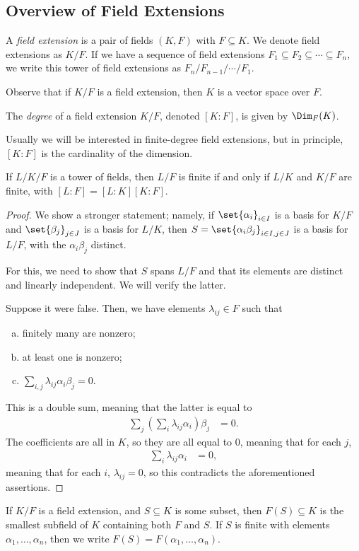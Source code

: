 \documentclass[10pt]{mypackage}
\begin{document}
\subsection{Overview of Field Extensions}%
\begin{definition}
  A \textit{field extension} is a pair of fields $\left( K,F \right)$ with $F\subseteq K$. We denote field extensions as $K/F$. If we have a sequence of field extensions $F_1\subseteq F_2\subseteq\cdots\subseteq F_n$, we write this tower of field extensions as $F_n/F_{n-1}/\cdots/F_1$.
\end{definition}
Observe that if $K/F$ is a field extension, then $K$ is a vector space over $F$.
\begin{definition}
  The \textit{degree} of a field extension $K/F$, denoted $\left[ K:F \right]$, is given by $\Dim_F(K)$.
\end{definition}
Usually we will be interested in finite-degree field extensions, but in principle, $\left[ K:F \right]$ is the cardinality of the dimension.
\begin{proposition}
  If $L/K/F$ is a tower of fields, then $L/F$ is finite if and only if $L/K$ and $K/F$ are finite, with $\left[ L:F \right] = \left[ L:K \right]\left[ K:F \right]$.
\end{proposition}
\begin{proof}
  We show a stronger statement; namely, if $\set{\alpha_i}_{i\in I}$ is a basis for $K/F$ and $\set{\beta_j}_{j\in J}$ is a basis for $L/K$, then $S = \set{\alpha_i\beta_j}_{i\in I,j\in J}$ is a basis for $L/F$, with the $\alpha_i\beta_j$ distinct.

  For this, we need to show that $S$ spans $L/F$ and that its elements are distinct and linearly independent. We will verify the latter.

  Suppose it were false. Then, we have elements $\lambda_{ij}\in F$ such that
  \begin{enumerate}[(a)]
    \item finitely many are nonzero;
    \item at least one is nonzero;
    \item $\sum_{i,j}\lambda_{ij}\alpha_i\beta_j = 0$.
  \end{enumerate}
  This is a double sum, meaning that the latter is equal to
  \begin{align*}
    \sum_{j} \left( \sum_{i}\lambda_{ij}\alpha_i \right)\beta_j &= 0.
  \end{align*}
  The coefficients are all in $K$, so they are all equal to $0$, meaning that for each $j$,
  \begin{align*}
    \sum_{i} \lambda_{ij}\alpha_i &= 0,
  \end{align*}
  meaning that for each $i$, $\lambda_{ij} = 0$, so this contradicts the aforementioned assertions.
\end{proof}
If $K/F$ is a field extension, and $S\subseteq K$ is some subset, then $F(S)\subseteq K$ is the smallest subfield of $K$ containing both $F$ and $S$. If $S$ is finite with elements $\alpha_1,\dots,\alpha_n$, then we write $F(S) = F\left( \alpha_1,\dots,\alpha_n \right)$. 
\end{document}
